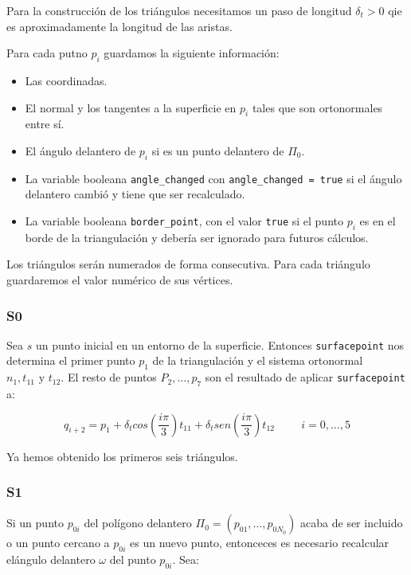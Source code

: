 Para la construcción de los triángulos necesitamos un paso de longitud $\delta_t > 0$ qie es aproximadamente la longitud de las aristas.
\par Para cada putno $p_i$ guardamos la siguiente información:
\begin{itemize}
	\item Las coordinadas.
	\item El normal y los tangentes a la superficie en $p_i$ tales que son ortonormales entre sí.
	\item El ángulo delantero de $p_i$ si es un punto delantero de $\Pi_0$.
	\item La variable booleana \texttt{angle\_changed} con \texttt{angle\_changed = true} si el ángulo delantero cambió y tiene que ser recalculado.
	\item La variable booleana \texttt{border\_point}, con el valor \texttt{true} si el punto $p_i$ es en el borde de la triangulación y debería ser ignorado para futuros cálculos.
\end{itemize}

Los triángulos serán numerados de forma consecutiva. Para cada triángulo guardaremos el valor numérico de sus vértices.

\subsubsection{S0}

Sea $s$ un punto inicial en un entorno de la superficie. Entonces \texttt{surfacepoint} nos determina el primer punto $p_1$ de la triangulación y el sistema ortonormal $n_1, t_{11} \text{ y } t_{12}$. El resto de puntos $P_2, \dotso, p_7$ son el resultado de aplicar \texttt{surfacepoint} a:

$$q_{i+2} = p_1 + \delta_t cos\left(\frac{i \pi}{3}\right)t_{11} + \delta_t sen\left(\frac{i\pi}{3}\right)t_{12} \hspace{1cm} i = 0, \dotso, 5$$

Ya hemos obtenido los primeros seis triángulos.

\subsubsection{S1}

Si un punto $p_{0i}$ del polígono delantero $\Pi_0 = (p_{01}, \dotso, p_{0N_0})$ acaba de ser incluido o un punto cercano a $p_{0i}$ es un nuevo punto, entonceces es necesario recalcular elángulo delantero $\omega$ del punto $p_{0i}$. Sea:

